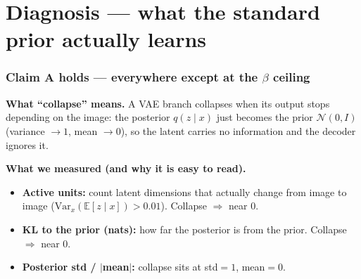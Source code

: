 \documentclass[11pt]{article}
\begin{document}
\part{Diagnosis --- what the standard prior actually learns}

\section{Claim A holds --- everywhere except at the $\beta$ ceiling}
\label{sec:collapse}
\textbf{What ``collapse'' means.} A VAE branch collapses when its output stops depending on
the image: the posterior $q(z\mid x)$ just becomes the prior $\mathcal{N}(0,I)$ (variance
$\to 1$, mean $\to 0$), so the latent carries no information and the decoder ignores it.

\textbf{What we measured (and why it is easy to read).}
\begin{itemize}
  \item \textbf{Active units:} count latent dimensions that actually change from image to
  image ($\mathrm{Var}_x(\mathbb{E}[z\mid x])>0.01$). Collapse $\Rightarrow$ near $0$.
  \item \textbf{KL to the prior (nats):} how far the posterior is from the prior.
  Collapse $\Rightarrow$ near $0$.
  \item \textbf{Posterior std / $|$mean$|$:} collapse sits at std$=1$, mean$=0$.
\end{itemize}
\end{document}
